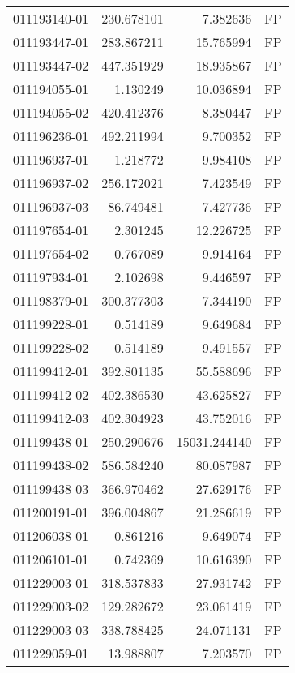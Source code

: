 \begin{tabular}{lrrl}
011193140-01 &  230.678101 &       7.382636 &   FP \\
011193447-01 &  283.867211 &      15.765994 &   FP \\
011193447-02 &  447.351929 &      18.935867 &   FP \\
011194055-01 &    1.130249 &      10.036894 &   FP \\
011194055-02 &  420.412376 &       8.380447 &   FP \\
011196236-01 &  492.211994 &       9.700352 &   FP \\
011196937-01 &    1.218772 &       9.984108 &   FP \\
011196937-02 &  256.172021 &       7.423549 &   FP \\
011196937-03 &   86.749481 &       7.427736 &   FP \\
011197654-01 &    2.301245 &      12.226725 &   FP \\
011197654-02 &    0.767089 &       9.914164 &   FP \\
011197934-01 &    2.102698 &       9.446597 &   FP \\
011198379-01 &  300.377303 &       7.344190 &   FP \\
011199228-01 &    0.514189 &       9.649684 &   FP \\
011199228-02 &    0.514189 &       9.491557 &   FP \\
011199412-01 &  392.801135 &      55.588696 &   FP \\
011199412-02 &  402.386530 &      43.625827 &   FP \\
011199412-03 &  402.304923 &      43.752016 &   FP \\
011199438-01 &  250.290676 &   15031.244140 &   FP \\
011199438-02 &  586.584240 &      80.087987 &   FP \\
011199438-03 &  366.970462 &      27.629176 &   FP \\
011200191-01 &  396.004867 &      21.286619 &   FP \\
011206038-01 &    0.861216 &       9.649074 &   FP \\
011206101-01 &    0.742369 &      10.616390 &   FP \\
011229003-01 &  318.537833 &      27.931742 &   FP \\
011229003-02 &  129.282672 &      23.061419 &   FP \\
011229003-03 &  338.788425 &      24.071131 &   FP \\
011229059-01 &   13.988807 &       7.203570 &   FP \\

\end{tabular}
